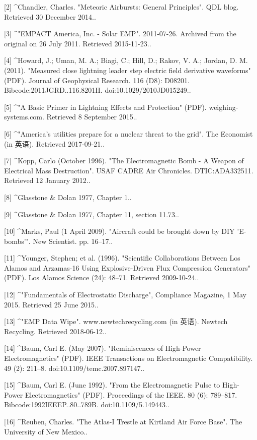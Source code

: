 [2]
^Chandler, Charles. "Meteoric Airbursts: General Principles". QDL blog. Retrieved 30 December 2014..

[3]
^"EMPACT America, Inc. - Solar EMP". 2011-07-26. Archived from the original on 26 July 2011. Retrieved 2015-11-23..

[4]
^Howard, J.; Uman, M. A.; Biagi, C.; Hill, D.; Rakov, V. A.; Jordan, D. M. (2011). "Measured close lightning leader step electric field derivative waveforms" (PDF). Journal of Geophysical Research. 116 (D8): D08201. Bibcode:2011JGRD..116.8201H. doi:10.1029/2010JD015249..

[5]
^"A Basic Primer in Lightning Effects and Protection" (PDF). weighing-systems.com. Retrieved 8 September 2015..

[6]
^"America's utilities prepare for a nuclear threat to the grid". The Economist (in 英语). Retrieved 2017-09-21..

[7]
^Kopp, Carlo (October 1996). "The Electromagnetic Bomb - A Weapon of Electrical Mass Destruction". USAF CADRE Air Chronicles. DTIC:ADA332511. Retrieved 12 January 2012..

[8]
^Glasstone & Dolan 1977, Chapter 1..

[9]
^Glasstone & Dolan 1977, Chapter 11, section 11.73..

[10]
^Marks, Paul (1 April 2009). "Aircraft could be brought down by DIY 'E-bombs'". New Scientist. pp. 16–17..

[11]
^Younger, Stephen; et al. (1996). "Scientific Collaborations Between Los Alamos and Arzamas-16 Using Explosive-Driven Flux Compression Generators" (PDF). Los Alamos Science (24): 48–71. Retrieved 2009-10-24..

[12]
^"Fundamentals of Electrostatic Discharge", Compliance Magazine, 1 May 2015. Retrieved 25 June 2015..

[13]
^"EMP Data Wipe". www.newtechrecycling.com (in 英语). Newtech Recycling. Retrieved 2018-06-12..

[14]
^Baum, Carl E. (May 2007). "Reminiscences of High-Power Electromagnetics" (PDF). IEEE Transactions on Electromagnetic Compatibility. 49 (2): 211–8. doi:10.1109/temc.2007.897147..

[15]
^Baum, Carl E. (June 1992). "From the Electromagnetic Pulse to High-Power Electromagnetics" (PDF). Proceedings of the IEEE. 80 (6): 789–817. Bibcode:1992IEEEP..80..789B. doi:10.1109/5.149443..

[16]
^Reuben, Charles. "The Atlas-I Trestle at Kirtland Air Force Base". The University of New Mexico..


